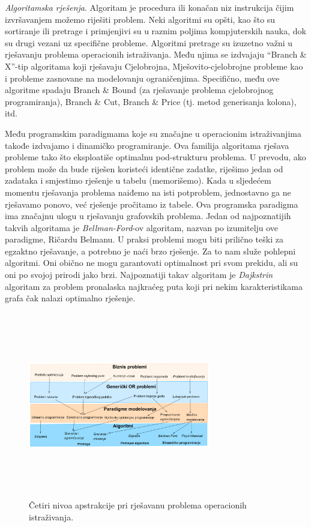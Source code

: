 \documentclass[a4paper, utf8, 11pt, colorlinks]{book}
\begin{document}
\emph{Algoritamska rješenja}. Algoritam je procedura ili konačan niz instrukcija čijim izvršavanjem možemo riješiti problem. Neki algoritmi su opšti, kao što su sortiranje ili pretrage i primjenjivi su u raznim poljima kompjuterskih nauka, dok su drugi vezani uz specifične probleme. Algoritmi pretrage su izuzetno važni u rješavanju problema operacionih istraživanja. Među njima se izdvajaju ``Branch \& X''-tip algoritama koji rješavaju Cjelobrojna, Mješovito-cjelobrojne probleme kao i probleme zasnovane na modelovanju ograničenjima. Specifično, među ove algoritme spadaju Branch \& Bound (za rješavanje problema cjelobrojnog programiranja), Branch \& Cut, Branch \& Price (tj. metod generisanja kolona), itd.

Među programskim paradigmama koje su značajne u operacionim istraživanjima takođe izdvajamo i dinamičko programiranje. Ova familija algoritama rješava probleme tako što eksploatiše optimalnu pod-strukturu problema. U prevodu, ako problem može da bude riješen koristeći identične zadatke, riješimo jedan od zadataka i smjestimo rješenje u tabelu (memorišemo). Kada u sljedećem momentu   rješavanja problema naiđemo na isti potproblem, jednostavno ga ne rješavamo ponovo, već rješenje pročitamo iz tabele. Ova programska paradigma ima značajnu ulogu u rješavanju grafovskih problema. Jedan od najpoznatijih takvih algoritama je \emph{Bellman-Ford}-ov algoritam, nazvan po izumitelju ove paradigme, Ričardu Belmanu. 
U praksi problemi mogu biti prilično teški za egzaktno rješavanje, a potrebno je naći brzo rješenje. Za to nam služe pohlepni algoritmi. Oni obično ne mogu 
garantovati optimalnost pri svom prekidu, ali su oni po svojoj prirodi jako brzi. Najpoznatiji takav algoritam je \emph{Dajkstrin} algoritam za problem pronalaska najkraćeg puta koji pri nekim karakteristikama grafa čak nalazi optimalno rješenje. 

\begin{figure}
    \centering
    \includegraphics[width=300, height=230pt]{overview.eps}
    \caption{Četiri nivoa apstrakcije pri rješavanu problema operacionih istraživanja.}
    \label{fig:OR_four_levels}
\end{figure}
\end{document}
